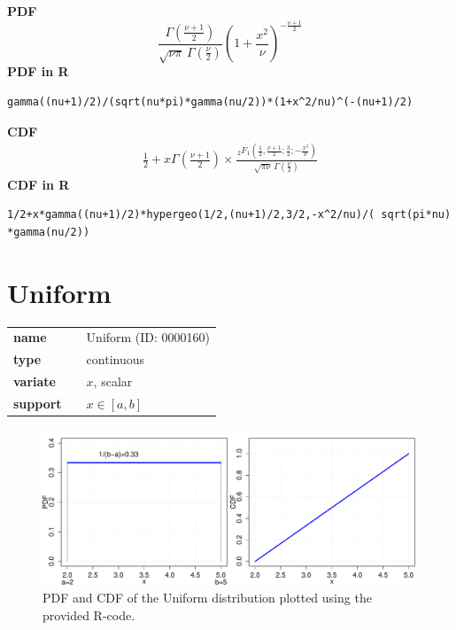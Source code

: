\smallskip \noindent \hspace{.2cm} \textbf{PDF} 
\begin{equation*}\frac{\Gamma \left(\frac{\nu+1}{2} \right)} {\sqrt{\nu\pi}\,\Gamma \left(\frac{\nu}{2} \right)} \left(1+\frac{x^2}{\nu} \right)^{-\frac{\nu+1}{2}}\end{equation*}
\smallskip \noindent \hspace{.2cm} \textbf{PDF in R}  
\begin{verbatim}gamma((nu+1)/2)/(sqrt(nu*pi)*gamma(nu/2))*(1+x^2/nu)^(-(nu+1)/2)\end{verbatim}
\smallskip \noindent \hspace{.2cm} \textbf{CDF} 
\begin{equation*}\begin{matrix}
     \frac{1}{2} + x \Gamma \left( \frac{\nu+1}{2} \right)  \times
     \frac{\,_2F_1 \left ( \frac{1}{2},\frac{\nu+1}{2};\frac{3}{2};
           -\frac{x^2}{\nu} \right)}
     {\sqrt{\pi\nu}\,\Gamma \left(\frac{\nu}{2}\right)}
     \end{matrix}\end{equation*}
\smallskip \noindent \hspace{.2cm} \textbf{CDF in R} 
\begin{verbatim}1/2+x*gamma((nu+1)/2)*hypergeo(1/2,(nu+1)/2,3/2,-x^2/nu)/( sqrt(pi*nu) *gamma(nu/2))\end{verbatim}
\smallskip\section*{Uniform} 

  \bigskip 

\begin{tabular}{p{2cm}cl}
\textbf{name} & & Uniform (ID: 0000160)\\ 
 
\textbf{type} & & continuous \\ 

\textbf{variate} & & $x$, scalar \\ 

\textbf{support} & & $x \in [a,b]$

\end{tabular}
\begin{figure}[htb!]
\centering
  \includegraphics[width=140mm]{pics/Uniform_pdf_cdf.pdf}
 \caption{PDF and CDF of the Uniform distribution plotted using the provided R-code.}
 \label{fig:Uniformpdfcdf}
\end{figure}

